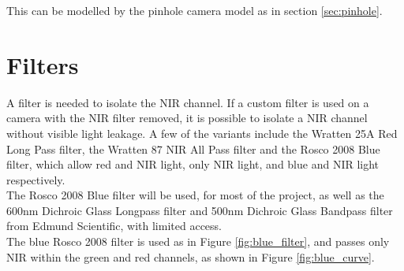 This can be modelled by the pinhole camera model as in section \ref{sec:pinhole}.

%
%
%


\section{Filters}

A filter is needed to isolate the NIR channel. If a custom filter is used on a camera with the NIR filter removed, it is possible to isolate a NIR channel without visible light leakage. A few of the variants include the Wratten 25A Red Long Pass filter, the Wratten 87 NIR All Pass filter and the Rosco 2008 Blue filter, which allow red and NIR light, only NIR light, and blue and NIR light respectively.\\

The Rosco 2008 Blue filter will be used, for most of the project, as well as the 600nm Dichroic Glass Longpass filter and 500nm Dichroic Glass Bandpass filter from Edmund Scientific, with limited access.\\

The blue Rosco 2008 filter is used as in Figure \ref{fig:blue_filter}, and passes only NIR within the green and red channels, as shown in Figure \ref{fig:blue_curve}.

